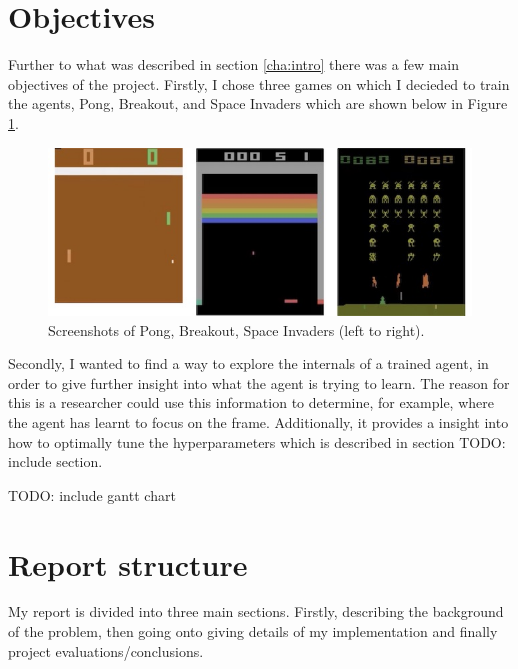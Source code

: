 \section{Objectives}
\label{intro:sec:obj}
Further to what was described in section \ref{cha:intro} there was a few main objectives of the project. Firstly, I chose three games on which I decieded to train the agents, Pong, Breakout, and Space Invaders which are shown below in Figure \ref{fig:atari-screenshot}.

\begin{figure}[htbp]
	\centering
	\includegraphics[scale=0.5]{chapters/chapter1/images/atari-combined.jpg}
	\caption{Screenshots of Pong, Breakout, Space Invaders (left to right).
		\label{fig:atari-screenshot}
	}
\end{figure}


Secondly, I wanted to find a way to explore the internals of a trained agent, in order to give further insight into what the agent is trying to learn. The reason for this is a researcher could use this information to determine, for example, where the agent has learnt to focus on the frame. Additionally, it provides a insight into how to optimally tune the hyperparameters which is described in section TODO: include section.

TODO: include gantt chart

\section{Report structure}
\label{intro:sec:report_struc}

My report is divided into three main sections. Firstly, describing the background of the problem, then going onto giving details of my implementation and finally project evaluations/conclusions.